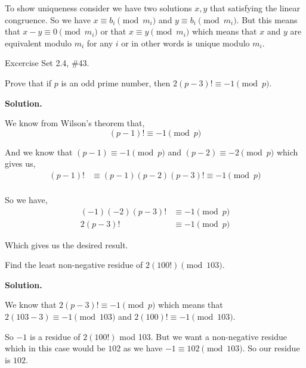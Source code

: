 \documentclass[12pt]{exam}
\begin{document}
\begin{questions}
\vspace{1em}


\vspace{1em}

To show uniqueness consider we have two solutions $x, y$ that satisfying the linear congruence. So we have $x \equiv b_i \pmod m_i$ and $y  \equiv b_i \pmod m_i$. But this means that $x - y \equiv 0 \pmod m_i$ or that $x \equiv y \pmod m_i$ which means that $x$ and $y$ are equivalent modulo $m_i$ for any $i$ or in other words is unique modulo $m_i$.








\newpage 
\question  Excercise Set 2.4, \#43.
\begin{parts}
\item Prove that if $p$ is an odd prime number, then $2(p-3)! \equiv -1 \pmod{p}$.

	\textbf{Solution.}

	We know from Wilson's theorem that, $$
	(p - 1)! \equiv -1 \pmod p
	$$

	And we know that $(p - 1) \equiv -1 \pmod p$ and $(p - 2) \equiv -2 \pmod p$ which gives us,
	\begin{align*}
		(p - 1) ! &\equiv (p - 1)(p - 2)(p - 3)!  \equiv -1 \pmod p\\
	\end{align*}

	So we have, 
	\begin{align*}
		(-1)(-2) (p - 3)! &\equiv -1 \pmod p\\
		2 (p - 3)! & \equiv -1 \pmod p
	\end{align*}

	Which gives us the desired result.

\item Find the least non-negative residue of $2(100!) \pmod{103}$.

	\textbf{Solution.}

	We know that $2(p - 3)! \equiv -1 \pmod p$ which means that $2 (103 - 3) \equiv -1 \pmod {103}$ and $2(100)! \equiv -1 \pmod {103}$.

	\vspace{1em}
	
	So $-1$ is a residue of $2(100!)$ mod 103. But we want a non-negative residue which in this case would be $102$ as we have $-1 \equiv 102 \pmod {103}$. So our residue is $102$.

\end{parts}


\end{questions}
\end{document}

